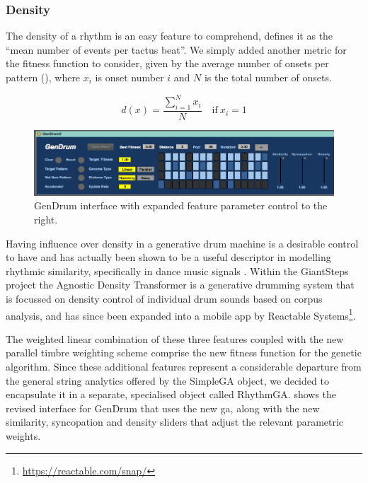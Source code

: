{{\subsubsection{Density}

The density of a rhythm is an easy feature to comprehend, \cite{Wiggins2012a} defines it as the ``mean number of events per tactus beat''. We simply added another metric for the fitness function to consider, given by the average number of onsets per pattern (), where $x_i$ is onset number $i$ and $N$ is the total number of onsets.

\begin{equation}
\label{eq:density}
	d(x)=\frac{\sum_{i=1}^{N}x_i}{N} \quad \text{if}\ x_i=1
\end{equation}

\begin{figure}
	\begin{center}
		\includegraphics[width=1.0\textwidth]{ch03_symbolic/figures/gendrum2.png}
	\end{center}
	\caption[GenDrum interface with expanded feature parameter control]{GenDrum interface with expanded feature parameter control to the right.}
	\label{fig:gendrum2}
\end{figure}

Having influence over density in a generative drum machine is a desirable control to have and  has actually been shown to be a useful descriptor in modelling rhythmic similarity, specifically in dance music signals \citep{Panteli2014a}. Within the GiantSteps project the Agnostic Density Transformer \citep{Jorda2016} is a generative drumming system that is focussed on density control of individual drum sounds based on corpus analysis, and has since been expanded into a mobile app by Reactable Systems\footnote{\url{https://reactable.com/snap/}}.

The weighted linear combination of these three features coupled with the new parallel timbre weighting scheme comprise the new fitness function for the genetic algorithm. Since these additional features represent a considerable departure from the general string analytics offered by the SimpleGA object, we decided to encapsulate it in a separate, specialised object called RhythmGA.  shows the revised interface for GenDrum that uses the new \acrshort{ga}, along with the new similarity, syncopation and density  sliders that adjust the relevant parametric weights.

}}
